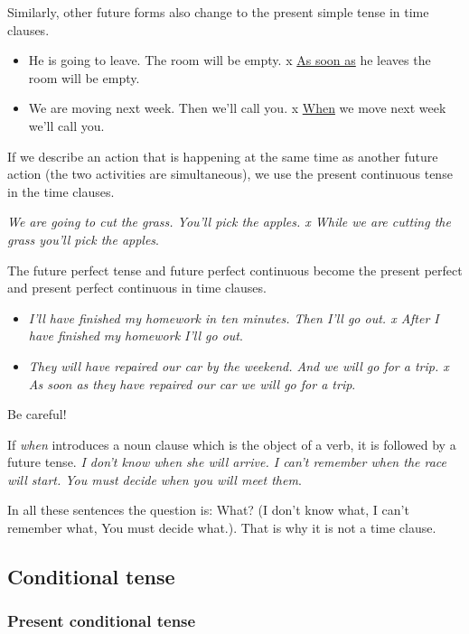 Similarly, other future forms also change to the present simple tense in time clauses.
 
\begin{itemize}
 
\item He is going to leave. The room will be empty. x \underline{As soon as} he leaves the room will be empty. 
\item We are moving next week. Then we'll call you. x \underline{When} we move next week we'll call you.
\end{itemize}

If we describe an action that is happening at the same time as another future action (the two activities are simultaneous), we use the present continuous tense in the time clauses.

\textit{We are going to cut the grass. You'll pick the apples. x While we are cutting the grass you'll pick the apples}.

The future perfect tense and future perfect continuous become the present perfect and present perfect continuous in time clauses.

\begin{itemize}

\item \textit{I'll have finished my homework in ten minutes. Then I'll go out. x After I have finished my homework I'll go out}.
\item \textit{They will have repaired our car by the weekend. And we will go for a trip. x As soon as they have repaired our car we will go for a trip}.
\end{itemize}

Be careful!

If \textit{when} introduces a noun clause which is the object of a verb, it is followed by a future tense. \textit{I don't know when she will arrive. I can't remember when the race will start. You must decide when you will meet them}.

In all these sentences the question is: What? (I don't know what, I can't remember what, You must decide what.). That is why it is not a time clause.

\subsection{Conditional tense}

\subsubsection{Present conditional tense}


